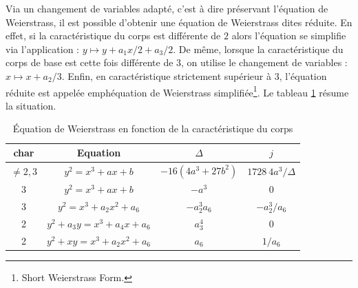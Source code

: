 Via un changement de variables adapté, c'est à dire préservant l'équation de Weierstrass, il est possible d'obtenir une équation de Weierstrass dites réduite. En effet, si la caractéristique du corps \field{} est différente de $2$ alors l'équation se simplifie via l'application : $y \mapsto y + a_1x/2 + a_3 /2$. De même, lorsque la caractéristique du corps de base est cette fois différente de $3$, on utilise le changement de variables : $x \mapsto x + a_2/3$. Enfin, en caractéristique strictement supérieur à $3$, l'équation réduite est appelée emph{équation de Weierstrass simplifiée}\footnote{Short Weierstrass Form.}. Le tableau \ref{tab:weierstrass} résume la situation.

\begin{table}[ht]
\centering
\begin{tabular}{|c|c|cc|}
\hline
char \field{} & Equation & $\Delta$ & $j$  \\
\hline \hline
\rule[0ex]{0pt}{3ex}
$\neq 2, 3$ & $y^2 = x^3 + ax + b$ & $-16(4a^3 + 27b^2)$ & $1728 \ 4 a^3 / \Delta$\\
3 & $y^2 = x^3 + ax + b$ & $-a^3$ & 0 \\
3 & $y^2 = x^3 + a_2x^2 + a_6$ & $-a_2^3a_6$ & $-a_2^3/a_6$\\
2 & $y^2 + a_3y = x^3 + a_4x + a_6$ & $a_3^4$ & $0$ \\
2 & $y^2 + xy = x^3 + a_2x^2 + a_6$ & $a_6$ & $1/a_6$\\
\hline
\end{tabular}
\caption{\'Equation de Weierstrass en fonction de la caractéristique du corps}
\label{tab:weierstrass}
\end{table}

